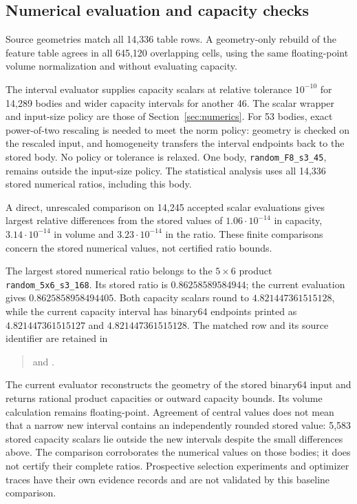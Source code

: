 \subsection{Numerical evaluation and capacity checks}\label{app:ds-evaluation}

Source geometries match all 14,336 table rows. A geometry-only rebuild of the
feature table agrees in all 645,120 overlapping cells, using the same
floating-point volume normalization and without evaluating capacity.

The interval evaluator supplies capacity scalars at relative tolerance
$10^{-10}$ for 14,289 bodies and wider capacity intervals for another 46.
The scalar wrapper and input-size policy are those of
Section~\ref{sec:numerics}. For 53 bodies, exact power-of-two rescaling is
needed to meet the norm policy: geometry is checked on the rescaled input,
and homogeneity transfers the interval endpoints back to the stored body.
No policy or tolerance is relaxed. One body, \texttt{random\_F8\_s3\_45},
remains outside the input-size policy. The statistical analysis uses all
14,336 stored numerical ratios, including this body.

A direct, unrescaled comparison on 14,245 accepted scalar evaluations gives
largest relative differences from the stored values of $1.06\cdot10^{-14}$
in capacity, $3.14\cdot10^{-14}$ in volume and $3.23\cdot10^{-14}$ in the
ratio. These finite comparisons concern the stored numerical values,
not certified ratio bounds.

The largest stored numerical ratio belongs to the $5\times6$ product
\texttt{random\_5x6\_s3\_168}. Its stored ratio is
$0.86258589584944$; the current evaluation gives
$0.8625858958494405$. Both capacity scalars round to
$4.821447361515128$, while the current capacity interval has binary64
endpoints printed as $4.821447361515127$ and $4.821447361515128$.
The matched row and its source identifier are retained in
\begin{quote}
\small\raggedright
{}
and .
\end{quote}

The current evaluator reconstructs the geometry of the stored binary64 input
and returns rational product capacities or outward capacity bounds. Its
volume calculation remains floating-point. Agreement of central values does
not mean that a narrow new interval contains an independently rounded stored
value: 5,583 stored capacity scalars lie outside the new intervals despite the
small differences above. The comparison corroborates the numerical values
on those bodies; it does not certify their complete ratios. Prospective selection experiments and optimizer traces have
their own evidence records and are not validated by this baseline comparison.

